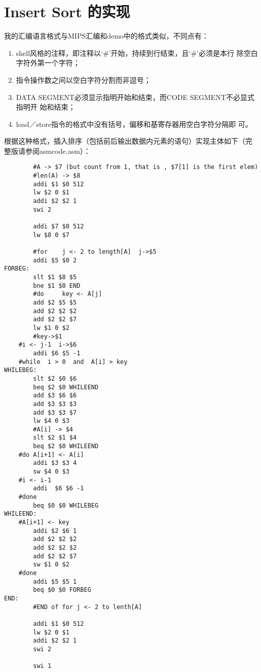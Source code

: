 \documentclass[a4paper,dvipdfm]{ctexart}
\begin{document}
\section{Insert Sort 的实现}
\label{sec:insertsort}

我的汇编语言格式与MIPS汇编和demo中的格式类似，不同点有：

\begin{enumerate}
\item shell风格的注释，即注释以‘\#’开始，持续到行结束，且‘\#’必须是本行
  除空白字符外第一个字符；
\item 指令操作数之间以空白字符分割而非逗号；
\item DATA SEGMENT必须显示指明开始和结束，而CODE SEGMENT不必显式指明开
  始和结束；
\item load／store指令的格式中没有括号，偏移和基寄存器用空白字符分隔即
  可。
\end{enumerate}

根据这种格式，插入排序（包括前后输出数据内元素的语句）实现主体如下（完
整版请参阅asmcode.asm）：

\begin{lstlisting}
        #A -> $7 (but count from 1, that is , $7[1] is the first elem)
        #len(A) -> $8
        addi $1 $0 512
        lw $2 0 $1
        addi $2 $2 1
        swi 2
        
        addi $7 $0 512
        lw $8 0 $7
        
        #for 	j <- 2 to length[A]  j->$5
        addi $5 $0 2
FORBEG: 
        slt $1 $8 $5
        bne $1 $0 END
        #do 	key <- A[j]
        add $2 $5 $5
        add $2 $2 $2
        add $2 $2 $7
        lw $1 0 $2
        #key->$1
	#i <- j-1  i->$6
        addi $6 $5 -1
	#while	i > 0  and  A[i] > key
WHILEBEG: 
        slt $2 $0 $6
        beq $2 $0 WHILEEND
        add $3 $6 $6
        add $3 $3 $3
        add $3 $3 $7
        lw $4 0 $3
        #A[i] -> $4
        slt $2 $1 $4
        beq $2 $0 WHILEEND
	#do	A[i+1] <- A[i]
        addi $3 $3 4
        sw $4 0 $3
	#i <- i-1
        addi  $6 $6 -1
	#done
        beq $0 $0 WHILEBEG
WHILEEND: 
	#A[i+1] <- key
        addi $2 $6 1
        add $2 $2 $2
        add $2 $2 $2    
        add $2 $2 $7
        sw $1 0 $2 
	#done
        addi $5 $5 1
        beq $0 $0 FORBEG
END:
        #END of for j <- 2 to lenth[A]

        addi $1 $0 512
        lw $2 0 $1
        addi $2 $2 1
        swi 2

        swi 1
\end{lstlisting}
\end{document}
